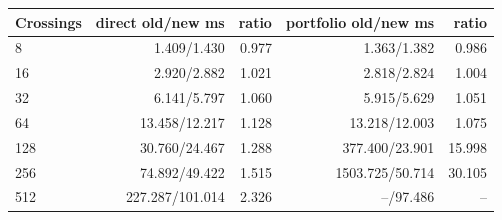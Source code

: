 \begin{center}\small
\begin{tabular}{@{}lrrrr@{}}
\toprule
Crossings & direct old/new ms & ratio & portfolio old/new ms & ratio \\
\midrule
8 & 1.409/1.430 & 0.977 & 1.363/1.382 & 0.986 \\
16 & 2.920/2.882 & 1.021 & 2.818/2.824 & 1.004 \\
32 & 6.141/5.797 & 1.060 & 5.915/5.629 & 1.051 \\
64 & 13.458/12.217 & 1.128 & 13.218/12.003 & 1.075 \\
128 & 30.760/24.467 & 1.288 & 377.400/23.901 & 15.998 \\
256 & 74.892/49.422 & 1.515 & 1503.725/50.714 & 30.105 \\
512 & 227.287/101.014 & 2.326 & --/97.486 & -- \\
\bottomrule
\end{tabular}
\end{center}
